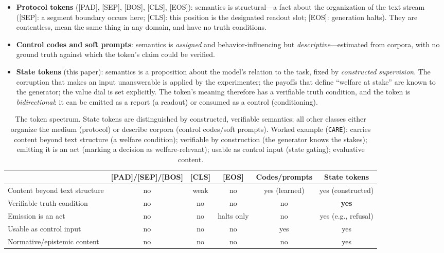 \documentclass[11pt]{article}
\newcommand{\care}{\texttt{CARE}}
\begin{document}
\begin{itemize}
\item \textbf{Protocol tokens} ([PAD], [SEP], [BOS], [CLS], [EOS]): semantics is structural---a fact about the organization of the text stream ([SEP]: a segment boundary occurs here; [CLS]: this position is the designated readout slot; [EOS]: generation halts). They are contentless, mean the same thing in any domain, and have no truth conditions.
\item \textbf{Control codes and soft prompts}: semantics is \emph{assigned} and behavior-influencing but \emph{descriptive}---estimated from corpora, with no ground truth against which the token's claim could be verified.
\item \textbf{State tokens} (this paper): semantics is a proposition about the model's relation to the task, fixed by \emph{constructed supervision}. The corruption that makes an input unanswerable is applied by the experimenter; the payoffs that define ``welfare at stake'' are known to the generator; the value dial is set explicitly. The token's meaning therefore has a verifiable truth condition, and the token is \emph{bidirectional}: it can be emitted as a report (a readout) or consumed as a control (conditioning).
\end{itemize}

\begin{table}[t]
\centering
\caption{The token spectrum. State tokens are distinguished by constructed, verifiable semantics; all other classes either organize the medium (protocol) or describe corpora (control codes/soft prompts). Worked example (\care): carries content beyond text structure (a welfare condition); verifiable by construction (the generator knows the stakes); emitting it is an act (marking a decision as welfare-relevant); usable as control input (state gating); evaluative content.}
\label{tab:taxonomy}
\footnotesize
\setlength{\tabcolsep}{3pt}
\begin{tabular}{l c c c c c}
\toprule
 & [PAD]/[SEP]/[BOS] & [CLS] & [EOS] & Codes/prompts & State tokens \\
\midrule
Content beyond text structure & no & weak & no & yes (learned) & yes (constructed) \\
Verifiable truth condition & no & no & no & no & \textbf{yes} \\
Emission is an act & no & no & halts only & no & yes (e.g., refusal) \\
Usable as control input & no & no & no & yes & yes \\
Normative/epistemic content & no & no & no & no & yes \\
\bottomrule
\end{tabular}
\end{table}
\end{document}
